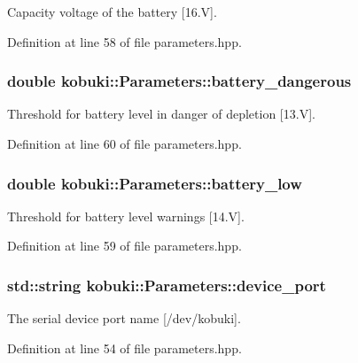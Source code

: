 \-Capacity voltage of the battery [16.\-V]. 



\-Definition at line 58 of file parameters.\-hpp.

\subsubsection[{battery\-\_\-dangerous}]{\setlength{\rightskip}{0pt plus 5cm}double {\bf kobuki\-::\-Parameters\-::battery\-\_\-dangerous}}\label{classkobuki_1_1Parameters_a6332cc2748b6f7095e1eb463a024289d}


\-Threshold for battery level in danger of depletion [13.\-V]. 



\-Definition at line 60 of file parameters.\-hpp.

\subsubsection[{battery\-\_\-low}]{\setlength{\rightskip}{0pt plus 5cm}double {\bf kobuki\-::\-Parameters\-::battery\-\_\-low}}\label{classkobuki_1_1Parameters_afbe3833926add7263db592c6b0116b36}


\-Threshold for battery level warnings [14.\-V]. 



\-Definition at line 59 of file parameters.\-hpp.

\subsubsection[{device\-\_\-port}]{\setlength{\rightskip}{0pt plus 5cm}std\-::string {\bf kobuki\-::\-Parameters\-::device\-\_\-port}}\label{classkobuki_1_1Parameters_a993217236ea68f063f5bc285414408e2}


\-The serial device port name [/dev/kobuki]. 



\-Definition at line 54 of file parameters.\-hpp.

